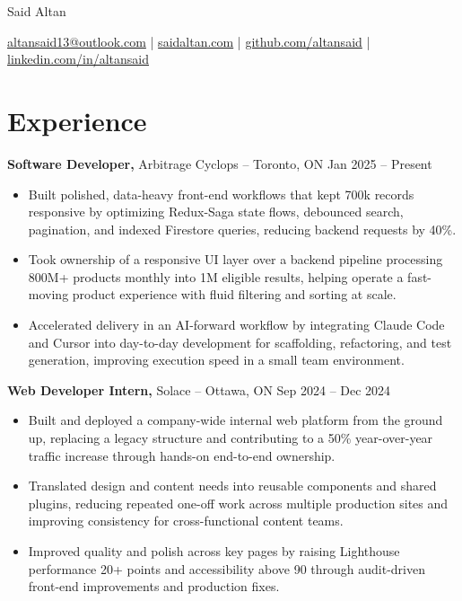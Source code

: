 \documentclass[11pt]{article}       %
\begin{document}
\centerline{\Huge Said Altan}

\vspace{10pt}

\centerline{\href{mailto:altansaid13@outlook.com}{altansaid13@outlook.com} | \href{https://saidaltan.com}{saidaltan.com} | \href{https://github.com/altansaid}{github.com/altansaid} | \href{https://www.linkedin.com/in/altansaid}{linkedin.com/in/altansaid}}


\vspace{5pt}
\section*{Experience}
\textbf{Software Developer,} {Arbitrage Cyclops} -- Toronto, ON \hfill Jan 2025 -- Present \\
\vspace{-9pt}
\begin{itemize}
  \item Built polished, data-heavy front-end workflows that kept 700k records responsive by optimizing Redux-Saga state flows, debounced search, pagination, and indexed Firestore queries, reducing backend requests by 40\%.
  \item Took ownership of a responsive UI layer over a backend pipeline processing 800M+ products monthly into 1M eligible results, helping operate a fast-moving product experience with fluid filtering and sorting at scale.
  \item Accelerated delivery in an AI-forward workflow by integrating Claude Code and Cursor into day-to-day development for scaffolding, refactoring, and test generation, improving execution speed in a small team environment.
\end{itemize}

\textbf{Web Developer Intern,} {Solace} -- Ottawa, ON \hfill Sep 2024 -- Dec 2024 \\
\vspace{-9pt}
\begin{itemize}
  \item Built and deployed a company-wide internal web platform from the ground up, replacing a legacy structure and contributing to a 50\% year-over-year traffic increase through hands-on end-to-end ownership.
  \item Translated design and content needs into reusable components and shared plugins, reducing repeated one-off work across multiple production sites and improving consistency for cross-functional content teams.
  \item Improved quality and polish across key pages by raising Lighthouse performance 20+ points and accessibility above 90 through audit-driven front-end improvements and production fixes.
\end{itemize}
\end{document}
